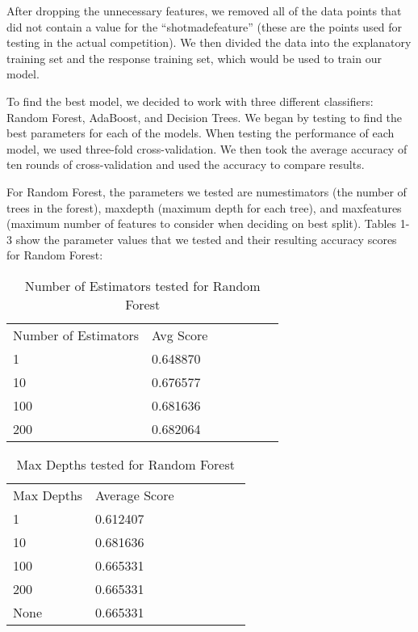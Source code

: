 \documentclass[11pt]{article}
\begin{document}
After dropping the unnecessary features, we removed all of the data points that did not contain a value for the ``shot\textunderscore made\textunderscore feature'' (these are the points used for testing in the actual competition). We then divided the data into the explanatory training set and the response training set, which would be used to train our model.

To find the best model, we decided to work with three different classifiers: Random Forest, AdaBoost, and Decision Trees. We began by testing to find the best parameters for each of the models. When testing the performance of each model, we used three-fold cross-validation. We then took the average accuracy of ten rounds of cross-validation and used the accuracy to compare results.

For Random Forest, the parameters we tested are num\textunderscore estimators (the number of trees in the forest), max\textunderscore depth (maximum depth for each tree), and max\textunderscore features (maximum number of features to consider when deciding on best split). Tables 1-3 show the parameter values that we tested and their resulting accuracy scores for Random Forest:

\begin{table}[H]
\centering
\caption{Number of Estimators tested for Random Forest}
\label{my-label}
\begin{tabular}{lllllll}
Number of Estimators & Avg Score &  &  &  &  &  \\
1                    & 0.648870  &  &  &  &  &  \\
10                   & 0.676577  &  &  &  &  &  \\
100                  & 0.681636  &  &  &  &  &  \\
200                  & 0.682064  &  &  &  &  & 
\end{tabular}
\end{table}

\begin{table}[H]
\centering
\caption{Max Depths tested for Random Forest}
\label{my-label}
\begin{tabular}{lllllll}
Max Depths & Average Score &  &  &  &  &  \\
1          & 0.612407  &  &  &  &  &  \\
10         & 0.681636  &  &  &  &  &  \\
100        & 0.665331  &  &  &  &  &  \\
200        & 0.665331  &  &  &  &  &  \\
None       & 0.665331  &  &  &  &  & 
\end{tabular}
\end{table}
\end{document}
